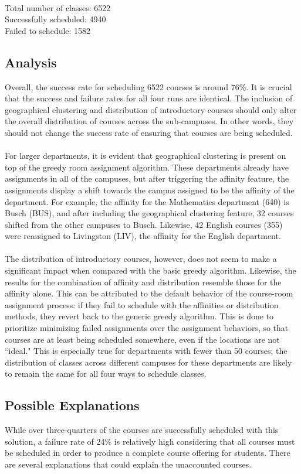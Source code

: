 \documentclass[12pt]{article}
\begin{document}
	\hfill\\Total number of classes: 6522 \\
	Successfully scheduled: 4940 \\
	Failed to schedule: 1582

\subsection{Analysis}
Overall, the success rate for scheduling 6522 courses is around 76\%. It is crucial that the success and failure rates for all four runs are identical. The inclusion of geographical clustering and distribution of introductory courses should only alter the overall distribution of courses across the sub-campuses. In other words, they should not change the success rate of ensuring that courses are being scheduled.
\\\\
For larger departments, it is evident that geographical clustering is present on top of the greedy room assignment algorithm. These departments already have assignments in all of the campuses, but after triggering the affinity feature, the assignments display a shift towards the campus assigned to be the affinity of the department. For example, the affinity for the Mathematics department (640) is Busch (BUS), and after including the geographical clustering feature, 32 courses shifted from the other campuses to Busch. Likewise, 42 English courses (355) were reassigned to Livingston (LIV), the affinity for the English department. 
\\\\
The distribution of introductory courses, however, does not seem to make a significant impact when compared with the basic greedy algorithm. Likewise, the results for the combination of affinity and distribution resemble those for the affinity alone. This can be attributed to the default behavior of the course-room assignment process: if they fail to schedule with the affinities or distribution methods, they revert back to the generic greedy algorithm. This is done to prioritize minimizing failed assignments over the assignment behaviors, so that courses are at least being scheduled somewhere, even if the locations are not ``ideal." This is especially true for departments with fewer than 50 courses; the distribution of classes across different campuses for these departments are likely to remain the same for all four ways to schedule classes.

\subsection{Possible Explanations}
While over three-quarters of the courses are successfully scheduled with this solution, a failure rate of 24\% is relatively high considering that all courses must be scheduled in order to produce a complete course offering for students. There are several explanations that could explain the unaccounted courses. 
\end{document}
